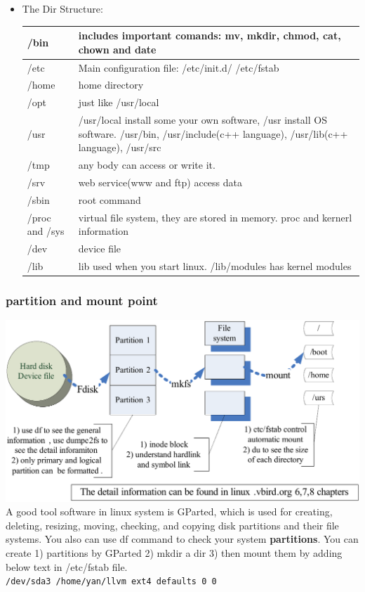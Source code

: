 \documentclass[a4paper,12pt,twoside]{book}
\begin{document}
\begin{itemize}
     \item The Dir Structure: \\
\begin{tabular}{|p{}|p{}|}
  \hline
  /bin & includes important comands: mv, mkdir, chmod, cat, chown and date  \\
 \hline  /etc & Main configuration file: /etc/init.d/ /etc/fstab \\
  \hline /home & home directory \\
  \hline /opt & just like /usr/local  \\
  \hline /usr & /usr/local install some your own software, /usr install OS software.  /usr/bin, /usr/include(c++ language), /usr/lib(c++ language),  /usr/src \\
  \hline /tmp & any body can access or write it.     \\
  \hline /srv & web service(www and ftp) access data \\
  \hline /sbin & root command \\
  \hline /proc and /sys & virtual file system, they are stored in memory.  proc and kernerl information \\
  \hline /dev & device file \\
  \hline /lib & lib used when you start linux. /lib/modules has kernel modules \\
  \hline 
\end{tabular}

\end{itemize} 
\subsubsection{partition and mount point}
	\includegraphics[scale=0.8]{pics/basic_file_system_clip}
	\\ 
   A good tool software in linux system is GParted, which  is used for creating, deleting, resizing, moving, checking, and copying disk partitions and their file systems.  You also can use df command to check your system \textbf{partitions}. You can create 1) partitions by GParted 2) mkdir a dir 3) then mount them by adding below text in /etc/fstab file.    \\   
   \verb=/dev/sda3 /home/yan/llvm ext4 defaults 0 0=
   
\end{document}
